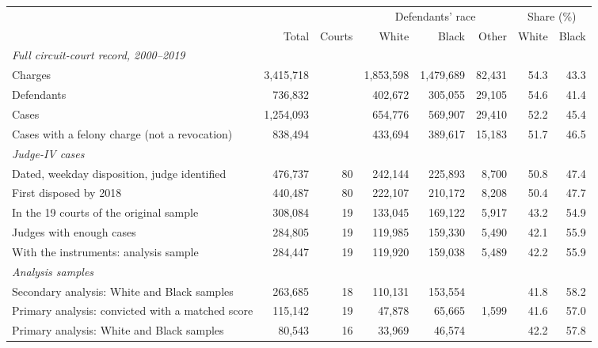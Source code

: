 \begin{tabular}{lrrrrrrr}
\toprule
 & & & \multicolumn{3}{c}{Defendants' race} & \multicolumn{2}{c}{Share (\%)} \\
\cmidrule(lr){4-6}\cmidrule(lr){7-8}
 & Total & Courts & White & Black & Other & White & Black \\
\midrule
\multicolumn{8}{l}{\textit{Full circuit-court record, 2000--2019}} \\
\quad Charges & 3,415,718 &  & 1,853,598 & 1,479,689 & 82,431 & 54.3 & 43.3 \\
\quad Defendants & 736,832 &  & 402,672 & 305,055 & 29,105 & 54.6 & 41.4 \\
\quad Cases & 1,254,093 &  & 654,776 & 569,907 & 29,410 & 52.2 & 45.4 \\
\quad Cases with a felony charge (not a revocation) & 838,494 &  & 433,694 & 389,617 & 15,183 & 51.7 & 46.5 \\
\multicolumn{8}{l}{\textit{Judge-IV cases}} \\
\quad Dated, weekday disposition, judge identified & 476,737 & 80 & 242,144 & 225,893 & 8,700 & 50.8 & 47.4 \\
\quad First disposed by 2018 & 440,487 & 80 & 222,107 & 210,172 & 8,208 & 50.4 & 47.7 \\
\quad In the 19 courts of the original sample & 308,084 & 19 & 133,045 & 169,122 & 5,917 & 43.2 & 54.9 \\
\quad Judges with enough cases & 284,805 & 19 & 119,985 & 159,330 & 5,490 & 42.1 & 55.9 \\
\quad With the instruments: analysis sample & 284,447 & 19 & 119,920 & 159,038 & 5,489 & 42.2 & 55.9 \\
\multicolumn{8}{l}{\textit{Analysis samples}} \\
\quad Secondary analysis: White and Black samples & 263,685 & 18 & 110,131 & 153,554 &  & 41.8 & 58.2 \\
\quad Primary analysis: convicted with a matched score & 115,142 & 19 & 47,878 & 65,665 & 1,599 & 41.6 & 57.0 \\
\quad Primary analysis: White and Black samples & 80,543 & 16 & 33,969 & 46,574 &  & 42.2 & 57.8 \\
\bottomrule
\end{tabular}
